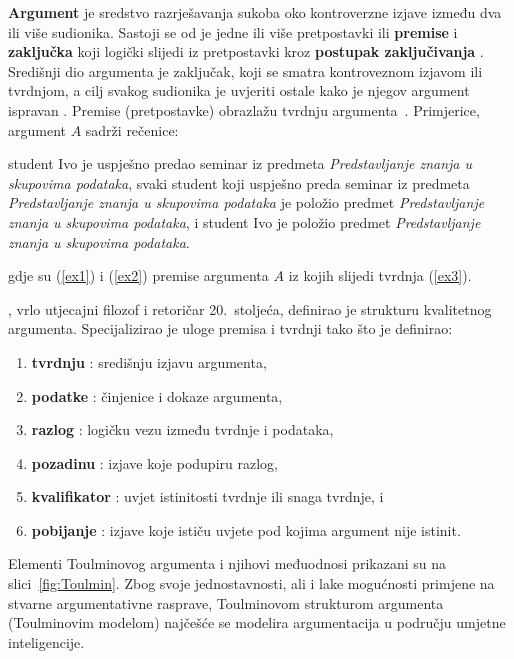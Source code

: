 \textbf{Argument} je sredstvo razrješavanja sukoba oko kontroverzne izjave 
 \citep{walton1990reasoning} između dva ili više sudionika.
Sastoji se od je jedne ili više pretpostavki ili \textbf{premise} 
i \textbf{zaključka}  koji logički slijedi iz pretpostavki kroz
\textbf{postupak zaključivanja} . 
Središnji dio argumenta je zaključak, koji se smatra
kontroveznom izjavom ili tvrdnjom, a cilj svakog sudionika je
uvjeriti ostale kako je njegov argument ispravan \citep{walton1990reasoning}. 
Premise (pretpostavke) obrazlažu   
tvrdnju argumenta~\citep{besnard2008elements}. 
Primjerice, argument $A$ sadrži rečenice: 

\begin{exe}
    \ex\label{ex1} student Ivo je uspješno predao seminar iz predmeta 
    \textit{Predstavljanje znanja u skupovima podataka},
    \ex\label{ex2} svaki student koji uspješno preda seminar iz predmeta 
    \textit{Predstavljanje znanja u skupovima podataka} je položio predmet 
    \textit{Predstavljanje znanja u skupovima podataka}, i
    \ex\label{ex3} student Ivo je položio predmet 
    \textit{Predstavljanje znanja u skupovima podataka}. 
\end{exe} 
gdje su (\ref{ex1}) i (\ref{ex2}) premise argumenta $A$ iz kojih slijedi tvrdnja (\ref{ex3}).

\cite{toulmin1974uses}, vrlo utjecajni filozof i retoričar 20.\ stoljeća, definirao je 
strukturu kvalitetnog argumenta. 
Specijalizirao je uloge premisa i tvrdnji tako što je definirao: 
\begin{enumerate}
    \item \textbf{tvrdnju} : središnju izjavu argumenta,
    \item \textbf{podatke} : činjenice i dokaze argumenta,
    \item \textbf{razlog} : logičku vezu između tvrdnje i podataka,
    \item \textbf{pozadinu} : izjave koje podupiru razlog,
    \item \textbf{kvalifikator} : uvjet istinitosti tvrdnje ili snaga tvrdnje, i
    \item \textbf{pobijanje} : izjave koje ističu uvjete pod kojima argument nije istinit.
\end{enumerate}
Elementi Toulminovog argumenta i njihovi međuodnosi prikazani su na slici~\ref{fig:Toulmin}.  
 Zbog svoje jednostavnosti, ali i 
lake mogućnosti primjene na stvarne argumentativne rasprave, 
Toulminovom strukturom argumenta (Toulminovim modelom) najčešće se
modelira argumentacija u području umjetne inteligencije. 

